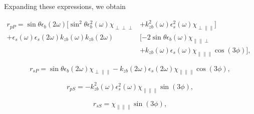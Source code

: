 \documentclass[letterpaper]{article}
\begin{document}
Expanding these expressions, we obtain

\begin{align*}
r_{pP} = \sin\theta\epsilon_{b}(2\omega)[\sin^{2}\theta\epsilon^{2}_{b}(\omega)\chi_{\perp\perp\perp} &+ k^{2}_{zb}(\omega)\epsilon^{2}_{s}(\omega)\chi_{\perp\parallel\parallel}] \nonumber \\
+ \epsilon_{s}(\omega)\epsilon_{s}(2\omega)k_{zb}(\omega)k_{zb}(2\omega)&[-2\sin\theta\epsilon_{b}(\omega)\chi_{\parallel\parallel\perp}&\\
&+ k_{zb}(\omega)\epsilon_{s}(\omega)\chi_{\parallel\parallel\parallel}\cos(3\phi)], \nonumber
\end{align*}

\begin{equation*}
r_{sP} = \sin\theta\epsilon_{b}(2\omega)\chi_{\perp\parallel\parallel} - k_{zb}(2\omega)\epsilon_{s}(2\omega)\chi_{\parallel\parallel\parallel}\cos(3\phi),
\end{equation*}

\begin{equation*}
r_{pS} = -k^{2}_{zb}(\omega)\epsilon^{2}_{s}(\omega)\chi_{\parallel\parallel\parallel}\sin(3\phi),
\end{equation*}

\begin{equation*}
r_{sS} = \chi_{\parallel\parallel\parallel}\sin(3\phi),
\end{equation*}



\end{document}
